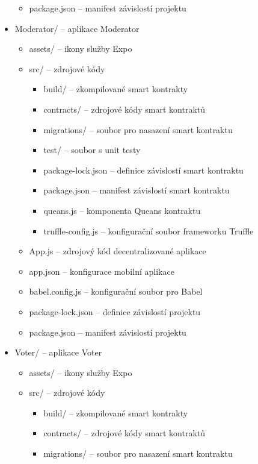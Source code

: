 \begin{itemize}
\begin{itemize}
        \item package.json -- manifest závislostí projektu
    \end{itemize}
    \item Moderator/ -- aplikace Moderator
    \begin{itemize}
        \item assets/ -- ikony služby Expo 
        \item src/ -- zdrojové kódy 
        \begin{itemize}
            \item build/ -- zkompilované smart kontrakty 
            \item contracts/ -- zdrojové kódy smart kontraktů
            \item migrations/ -- soubor pro nasazení smart kontraktu
            \item test/ -- soubor s unit testy
            \item package-lock.json -- definice závislostí smart kontraktu
            \item package.json -- manifest závislostí smart kontraktu
            \item queans.js -- komponenta Queans kontraktu
            \item truffle-config.js -- konfigurační soubor frameworku Truffle
        \end{itemize}
        \item App.js -- zdrojový kód decentralizované aplikace
        \item app.json -- konfigurace mobilní aplikace
        \item babel.config.js -- konfigurační soubor pro Babel
        \item package-lock.json -- definice závislostí projektu
        \item package.json -- manifest závislostí projektu
    \end{itemize}
        \item Voter/ -- aplikace Voter
    \begin{itemize}
        \item assets/ -- ikony služby Expo 
        \item src/ -- zdrojové kódy 
        \begin{itemize}
            \item build/ -- zkompilované smart kontrakty 
            \item contracts/ -- zdrojové kódy smart kontraktů
            \item migrations/ -- soubor pro nasazení smart kontraktu

\end{itemize}
\end{itemize}
\end{itemize}
